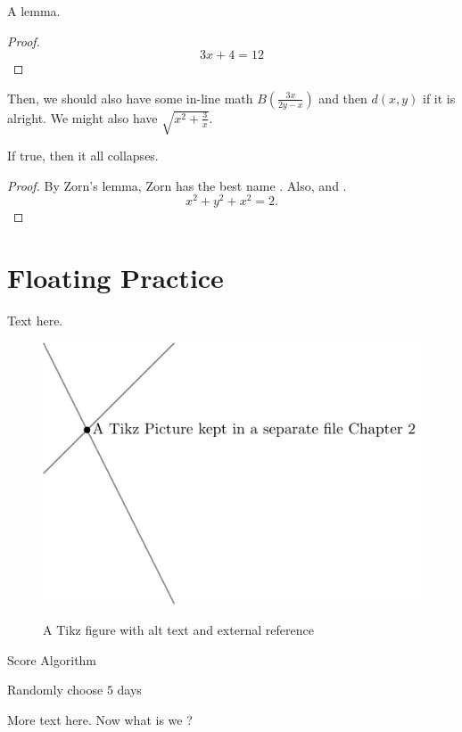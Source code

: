 \begin{lemma}
  A lemma.
\end{lemma}
\begin{proof}
  \[3x+4=12\]
\end{proof}

Then, we should also have some in-line math $B\left(\frac{3x}{2y-x}\right)$ and then $d(x,y)$ if it is alright. We might also have $\sqrt{x^2+\frac{3}{x}}$.

\begin{theorem}
  If true, then it all collapses.
\end{theorem}
\begin{proof}
  By Zorn's lemma, Zorn has the best name \autocite{martiniCompleteReducedConvex2019}.
  Also, \autocite{chenGraphHomotopyGraham2001} and \autocite{dochtermannMinimalGraphsContractible2023}.
  \[x^2+y^2+x^2=2.\]

\end{proof}
\section{Floating Practice}
Text here.

\begin{figure}\centering
  \includegraphics[alt={two lines intersecting at a point}]{Images/tikzPic.pdf}
  \caption{A Tikz figure with alt text and external reference}
\end{figure}

\begin{algorithm}
  \caption{Score Algorithm}
  \begin{algorithmic}[1]
    \Statex
    \State Randomly choose $5$ days
    \EndFor
    \EndFor
  \end{algorithmic}
\end{algorithm}

More text here. Now what is we ?

\printbibliography[heading=subbibnumbered]

